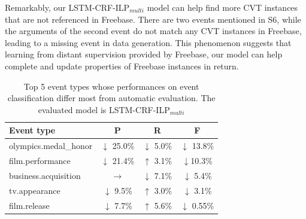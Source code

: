 Remarkably, our LSTM-CRF-ILP$_{multi}$ model can help find more CVT instances that are not referenced in Freebase. There are two events mentioned in S6, while the arguments of the second event do not match any CVT instances in Freebase, leading to a missing event in data generation. This phenomenon suggests that learning from distant supervision provided by Freebase, our model can help complete and update properties of Freebase instances in return.

\begin{table}[h]
\small
\centering
\begin{tabular}{|l|c|c|c|} \hline
	Event type & P & R & F \\ \hline
	olympics.medal\_honor%
	& $\downarrow$ 25.0\% & $\downarrow$ 5.0\% & $\downarrow$ 13.8\% \\ \hline
	film.performance & $\downarrow$ 21.4\% & $\uparrow$ 3.1\% & $\downarrow$10.3\% \\ \hline
	business.acquisition & $\rightarrow$ & $\downarrow$ 7.1\% & $\downarrow$ 5.4\% \\ \hline
	tv.appearance%
	& $\downarrow$ 9.5\% & $\uparrow$ 3.0\% & $\downarrow$ 3.1\% \\ \hline
	film.release%
	& $\downarrow$ 7.7\% & $\uparrow$ 5.6\% & $\downarrow$ 0.55\% \\ \hline
\end{tabular}
\caption{Top 5 event types whose performances on event classification differ most from automatic evaluation. The evaluated model is LSTM-CRF-ILP$_{multi}$ \label{tab:4}}
\end{table}

